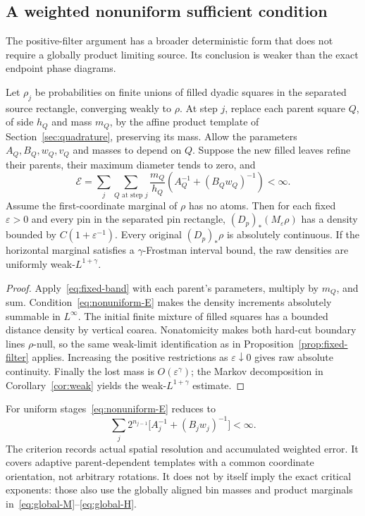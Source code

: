 \subsection{A weighted nonuniform sufficient condition}
The positive-filter argument has a broader deterministic form that does
not require a globally product limiting source. Its conclusion is weaker
than the exact endpoint phase diagrams.

\begin{theorem}\label{thm:nonuniform}
Let $\rho_j$ be probabilities on finite unions of filled dyadic squares
in the separated source rectangle, converging weakly to $\rho$.
At step $j$, replace each parent square $Q$, of side $h_Q$ and mass $m_Q$,
by the affine product template of Section~\ref{sec:quadrature}, preserving
its mass. Allow the parameters $A_Q,B_Q,w_Q,v_Q$ and masses to depend
on $Q$. Suppose the new filled leaves refine their parents, their maximum
diameter tends to zero, and
\begin{equation}\label{eq:nonuniform-E}
 \mathcal E=\sum_j\sum_{Q\text{ at step }j}\frac{m_Q}{h_Q}
 \left(A_Q^{-1}+(B_Qw_Q)^{-1}\right)<\infty.
\end{equation}
Assume the first-coordinate marginal of $\rho$ has no atoms. Then for
each fixed $\varepsilon>0$ and every pin in the separated pin rectangle,
$(D_p)_*(M_\varepsilon\rho)$ has a density bounded by
$C(1+\varepsilon^{-1})$. Every original $(D_p)_*\rho$ is absolutely
continuous. If the horizontal marginal satisfies a $\gamma$-Frostman
interval bound, the raw densities are uniformly weak-$L^{1+\gamma}$.
\end{theorem}
\begin{proof}
Apply~\eqref{eq:fixed-band} with each parent's parameters, multiply by
$m_Q$, and sum. Condition~\eqref{eq:nonuniform-E} makes the density
increments absolutely summable in $L^\infty$. The initial finite mixture
of filled squares has a bounded distance density by vertical coarea.
Nonatomicity makes both hard-cut boundary lines $\rho$-null, so the same
weak-limit identification as in Proposition~\ref{prop:fixed-filter} applies.
Increasing the positive restrictions as $\varepsilon\downarrow0$ gives
raw absolute continuity. Finally the lost mass is $O(\varepsilon^\gamma)$;
the Markov decomposition in Corollary~\ref{cor:weak} yields the
weak-$L^{1+\gamma}$ estimate.
\end{proof}
For uniform stages~\eqref{eq:nonuniform-E} reduces to
\[
 \sum_j 2^{n_{j-1}}
       \bigl[A_j^{-1}+(B_jw_j)^{-1}\bigr]<\infty.
\]
The criterion records actual spatial resolution and accumulated weighted
error. It covers adaptive parent-dependent templates with a common
coordinate orientation, not arbitrary rotations. It does not by itself
imply the exact critical exponents: those also use the globally aligned
bin masses and product marginals in~\eqref{eq:global-M}--\eqref{eq:global-H}.
